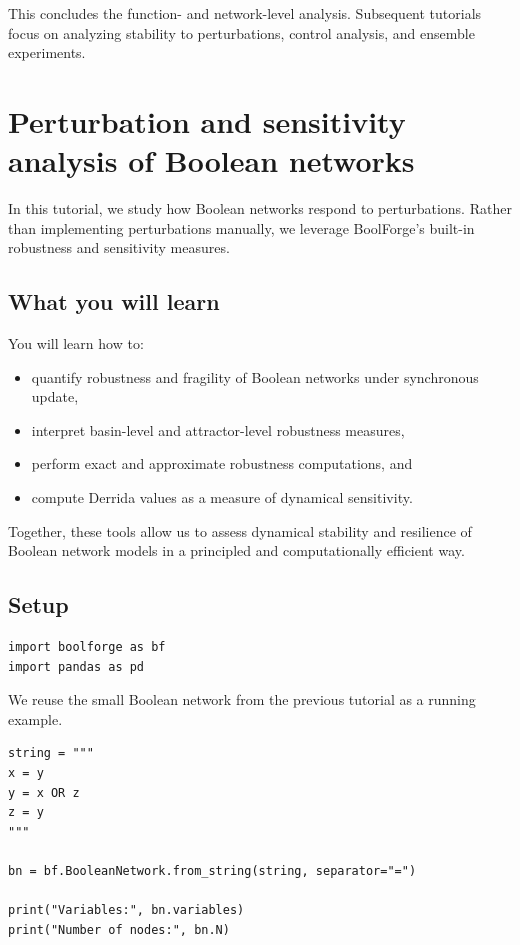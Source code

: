 \documentclass[
]{article}
\providecommand{\tightlist}{%
  \setlength{\itemsep}{0pt}\setlength{\parskip}{0pt}}
\begin{document}
This concludes the function- and network-level analysis. Subsequent
tutorials focus on analyzing stability to perturbations, control
analysis, and ensemble experiments.

\section{Perturbation and sensitivity analysis of Boolean
networks}\label{perturbation-and-sensitivity-analysis-of-boolean-networks}

In this tutorial, we study how Boolean networks respond to
perturbations. Rather than implementing perturbations manually, we
leverage BoolForge's built-in robustness and sensitivity measures.

\subsection{What you will learn}\label{what-you-will-learn-7}

You will learn how to:

\begin{itemize}
\tightlist
\item
  quantify robustness and fragility of Boolean networks under
  synchronous update,
\item
  interpret basin-level and attractor-level robustness measures,
\item
  perform exact and approximate robustness computations, and
\item
  compute Derrida values as a measure of dynamical sensitivity.
\end{itemize}

Together, these tools allow us to assess dynamical stability and
resilience of Boolean network models in a principled and computationally
efficient way.

\subsection{Setup}\label{setup-7}

\begin{lstlisting}
import boolforge as bf
import pandas as pd
\end{lstlisting}

We reuse the small Boolean network from the previous tutorial as a
running example.

\begin{lstlisting}
string = """
x = y
y = x OR z
z = y
"""

bn = bf.BooleanNetwork.from_string(string, separator="=")

print("Variables:", bn.variables)
print("Number of nodes:", bn.N)
\end{lstlisting}
\end{document}
